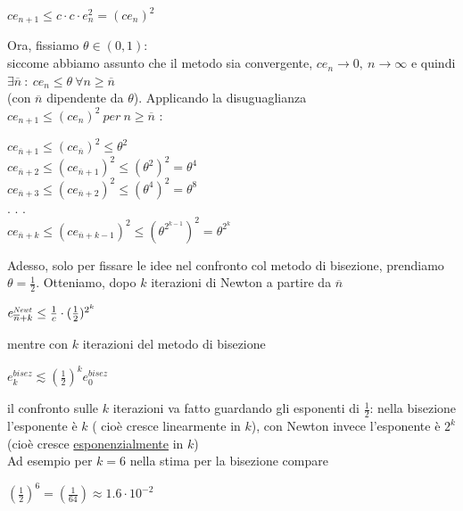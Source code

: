 \documentclass[12pt]{article}
\begin{document}
\begin{center}
    $ce_{n+1} \leq c \cdot c \cdot e_{n}^2 = ( ce_n)^2$\\
\end{center}
Ora, fissiamo $\theta \in (0,1)$:\\
siccome abbiamo assunto che il metodo sia convergente, $ce_n\rightarrow0,\ n\rightarrow\infty$ e quindi $\exists \overline{n} \ : \ ce_n \leq \theta \ \forall n \geq \overline{n}$\\
(con $\overline{n}$ dipendente da $\theta$). Applicando la disuguaglianza  $ce_{n+1} \leq (ce_n)^2 \ per \ n \geq \overline{n}$ : 
\begin{center}
$ce_{\overline{n}+1}\leq(ce_{\overline{n}})^2\leq\theta^2$\\
$ce_{\overline{n}+2}\leq(ce_{\overline{n}+1})^2\leq(\theta^2)^2=\theta^4$\\
$ce_{\overline{n}+3}\leq(ce_{\overline{n}+2})^2\leq(\theta^4)^2=\theta^8$\\
. . . \\
$ce_{\overline{n}+k}\leq(ce_{\overline{n}+k-1})^2\leq(\theta^{2^{k-1}})^2=\theta^{2^k}$\\
\end{center}
Adesso, solo per fissare le idee nel confronto col metodo di bisezione, prendiamo $\theta=\frac{1}{2}$. Otteniamo, dopo $k$ iterazioni di Newton a partire da $\overline{n}$ \\
\begin{center}
    $e^{\scalebox{.6}{$Newt$}}_{\overline{n}+k}\leq\frac{1}{c}\cdot(\frac{1}{2})^{2^k}$\\
\end{center}
mentre con $k$ iterazioni del metodo di bisezione \\
\begin{center}
    $e^{bisez}_{k}\lesssim (\frac{1}{2})^k e_{0}^{bisez}$\\
\end{center}
il confronto sulle $k$ iterazioni va fatto guardando gli esponenti
di $\frac{1}{2}$: nella bisezione l'esponente è $k$ ( cioè cresce linearmente in $k$), con Newton invece l'esponente è $2^k$ (cioè cresce \underline{esponenzialmente} in $k$)\\
Ad esempio per $k=6$ nella stima per la bisezione compare\\
\begin{center}
    $(\frac{1}{2})^{6}=(\frac{1}{64})\approx 1.6\cdot10^{-2}$\\

\end{center}
\end{document}

